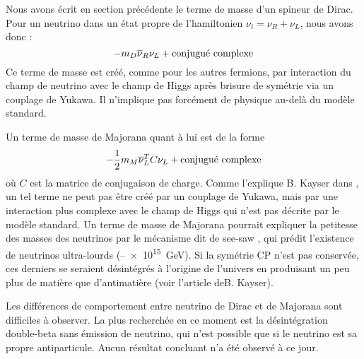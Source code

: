       Nous avons écrit en section précédente le terme de masse d'un spineur de Dirac. Pour un neutrino dans un état propre de l'hamiltonien $\nu_i=\nu_R+\nu_L$, nous avons donc : 
      \begin{equation}
	    -m_D\overline{\nu}_R \nu_L + \text{conjugué complexe}
      \end{equation}
      Ce terme de masse est créé, comme pour les autres fermions, par interaction du champ de neutrino avec le champ de Higgs après brisure de symétrie via un couplage de Yukawa. Il n'implique pas forcément de physique au-delà du modèle standard.

      Un terme de masse de Majorana quant à lui est de la forme
      \begin{equation}\label{eq::majorana_mass}
        -\frac{1}{2}m_M\overline{\nu}_L^T C \nu_L + \text{conjugué complexe}
      \end{equation}
      où $C$ est la matrice de conjugaison de charge. Comme l'explique B. Kayser dans \cite{Kayser2009}, un tel terme ne peut pas être créé par un couplage de Yukawa, mais par une interaction plus complexe avec le champ de Higgs qui n'est pas décrite par le modèle standard. Un terme de masse de Majorana pourrait expliquer la petitesse des masses des neutrinos par le mécanisme dit de see-saw , qui prédit l'existence de neutrinos ultra-lourds (--\SI{e15}{\giga\electronvolt}). Si la symétrie CP n'est pas conservée, ces derniers se seraient désintégrés à l'origine de l'univers en produisant un peu plus de matière que d'antimatière (voir l'article deB. Kayser\cite{Kayser2005}).

      Les différences de comportement entre neutrino de Dirac et de Majorana sont difficiles à observer. La plus recherchée en ce moment est la désintégration double-beta sans émission de neutrino, qui n'est possible que si le neutrino est sa propre antiparticule. Aucun résultat concluant n'a été observé à ce jour\cite{Dolinski2019}.